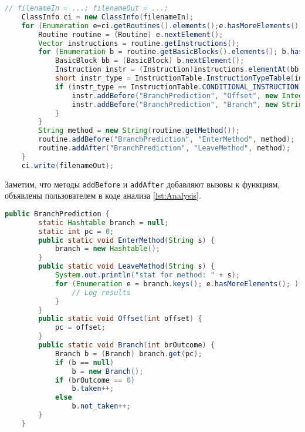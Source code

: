 \begin{lstlisting}[language=Java, caption=Подсчет условных переходов на \texttt{BIT}. Код инструментации, label=lst:Instrumentation]
    // filenameIn = ...; filenameOut = ...;
    ClassInfo ci = new ClassInfo(filenameIn);
    for (Enumeration e=ci.getRoutines().elements();e.hasMoreElements(); ){
        Routine routine = (Routine) e.nextElement();
        Vector instructions = routine.getInstructions();
        for (Enumeration b = routine.getBasicBlocks().elements(); b.hasMoreElements(); ) {
            BasicBlock bb = (BasicBlock) b.nextElement();
            Instruction instr = (Instruction)instructions.elementAt(bb.getEndAddress());
            short instr_type = InstructionTable.InstructionTypeTable[instr.getOpcode()];
            if (instr_type == InstructionTable.CONDITIONAL_INSTRUCTION) {
                instr.addBefore("BranchPrediction", "Offset", new Integer(instr.getOrigOffset()));
                instr.addBefore("BranchPrediction", "Branch", new String("BranchOutcome"));
            }
        }
        String method = new String(routine.getMethod());
        routine.addBefore("BranchPrediction", "EnterMethod", method);
        routine.addAfter("BranchPrediction", "LeaveMethod", method);
    }
    ci.write(filenameOut);
\end{lstlisting}

Заметим, что методы \texttt{addBefore} и \texttt{addAfter} добавляют вызовы к функциям, объявлены пользователем в коде анализа \autoref{lst:Analysis}.

\begin{lstlisting}[language=Java, caption=Подсчет условных переходов на \texttt{BIT}. Код анализа, label=lst:Analysis]
    public BranchPrediction {
        static Hashtable branch = null;
        static int pc = 0;
        public static void EnterMethod(String s) {
            branch = new Hashtable();
        }
        public static void LeaveMethod(String s) {
            System.out.println("stat for method: " + s);
            for (Enumeration e = branch.keys(); e.hasMoreElements(); ) {
                // Log results
            }
        }
        public static void Offset(int offset) {
            pc = offset;
        }
        public static void Branch(int brOutcome) {
            Branch b = (Branch) branch.get(pc);
            if (b == null)
                b = new Branch();
            if (brOutcome == 0)
                b.taken++;
            else
                b.not_taken++;
        }
    }
\end{lstlisting}

